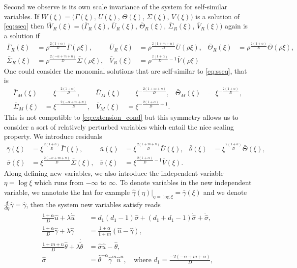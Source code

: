 \documentclass[a4paper,11pt]{article}
\def\blue{\color{blue}}
\def\bG{{\bar{\Gamma}}}
\def\bV{{\bar{V}}}
\def\bTh{{\bar{\Theta}}}
\def\bS{{\bar{\Sigma}}}
\def\bU{{\bar{U}}}
\def\bg{{\bar{\gamma}}}
\def\bv{{\bar{v}}}
\def\bth{{\bar{\theta}}}
\def\bs{{\bar{\sigma}}}
\def\bu{{\bar{u}}}
\def\tth{{\tilde{\theta}}}
\def\hg{{\hat{\gamma}}}
\def\hth{{\hat{\theta}}}
\def\hs{{\hat{\sigma}}}
\def\hu{{\hat{u}}}
\theoremstyle{remark}
\begin{document}
Second we observe is its own scale invariance of the system for self-similar variables. If $\bar{W}(\xi)=\big(\bG(\xi)$, $\bU(\xi)$, $\bTh(\xi)$, $\bS(\xi)$, $\bV(\xi)\big)$ is a solution of \eqref{eq:sseq} then $\bar{W}_R(\xi)=\big(\bG _R(\xi)$, $\bU_R(\xi)$, $\bTh_R(\xi)$, $\bS_R(\xi)$, $\bV_R(\xi)\big)$ again is a solution if
{\blue
\begin{align*}
\bG _R(\xi)&=\rho^ \frac{2(1+ \alpha)}{D}\bG(\rho\xi), & \bU _R(\xi) &= \rho^ \frac{2(1+ m+n)}{D}\bU(\rho\xi), &
\bTh _R(\xi)&=\rho^ \frac{2(1+ \alpha)}{D}\bTh(\rho\xi), \\
\bS _R(\xi)&=\rho^ \frac{2(-\alpha+m+n)}{D}\bS(\rho\xi), & \bV _R(\xi) &=\rho^ {\frac{2(1+ \alpha)}{D}-1}\bV(\rho\xi)
\end{align*}
}
One could consider the monomial solutions that are self-similar to \eqref{eq:sseq}, that is
\begin{align*}
\bG_M(\xi) &= \xi^ {-\frac{2(1+ \alpha)}{D}}, & \bU_M(\xi) &= \xi^ {-\frac{2(1+ m+n)}{D}}, &
\bTh_M(\xi)&=\xi^ {-\frac{2(1+ \alpha)}{D}}, \\
\bS_M(\xi)&=\xi^ {-\frac{2(-\alpha+m+n)}{D}}, & \bV_M(\xi) &=\xi^ {-\frac{2(1+ \alpha)}{D}+1}.
\end{align*}
This is not compatible to \eqref{eq:extension_cond} but this symmetry allows us to consider a sort of relatively perturbed variables which entail the nice scaling property. We introduce residuals
\begin{align*}
\bg(\xi) &= \xi^ \frac{2(1+ \alpha)}{D}\bG(\xi), & \bu(\xi) &= \xi^ \frac{2(1+ m+n)}{D}\bU(\xi), &
\bth(\xi)&=\xi^ \frac{2(1+ \alpha)}{D}\bTh(\xi), \\
\bs(\xi)&=\xi^ \frac{2(-\alpha+m+n)}{D}\bS(\xi), & \bv(\xi) &=\xi^ {\frac{2(1+ \alpha)}{D}-1}\bV(\xi).
\end{align*}
Along defining new variables, we also introduce the independent variable $\eta = \log\xi$ which runs from $-\infty$ to $\infty$. To denote variables in the new independent variable, we annotate the hat for example $\hg(\eta)|_{\eta=\log\xi}=\bg(\xi)$ and we denote $\frac{d}{d\eta} \hg = \dot\hg$, then the system new variables satisfy reads
\begin{equation} \label{eq:tildesys}
\begin{aligned}
\frac{1+ \alpha}{D} \hu + \lambda \dot\hu &= d_1(d_1-1)\hs + (d_1+d_1-1)\dot\hs + \ddot\hs,\\
\frac{1+ \alpha}{D} \hg + \lambda \dot\hg &= \frac{1 + \alpha}{1+m}( \hu - \hg ),\\
\frac{1+ m+n}{D} \hth + \lambda \dot\tth &= \hs\hu-\hth,\\
\hs &=\hth^{- \alpha} \hg ^m \hu ^n, \quad \text{where $d_1=\frac{-2(- \alpha +m+n)}{D}$},
\end{aligned}
\end{equation}
\end{document}
